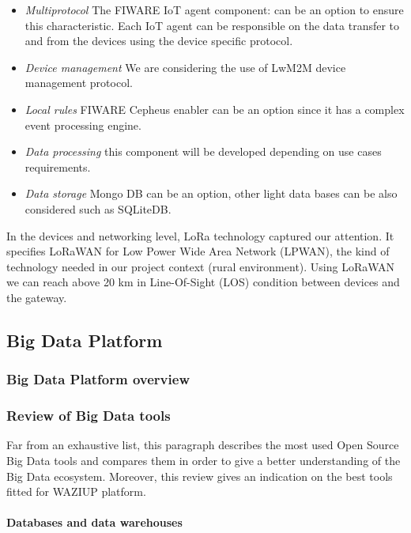 \begin{itemize}
    \item \emph{Multiprotocol}
The FIWARE IoT agent component: can be an option to ensure this characteristic. 
Each IoT agent can be responsible on the data transfer to and from the devices using the device specific protocol. 
    \item \emph{Device management}
We are considering the use of LwM2M device management protocol.
    \item \emph{Local rules}
FIWARE Cepheus enabler can be an option since it has a complex event processing engine. 
    \item \emph{Data processing}
this component will be developed depending on use cases requirements.
    \item \emph{Data storage}
Mongo DB can be an option, other light data bases can be also considered such as SQLiteDB.
\end{itemize}

In the devices and networking level, LoRa technology captured our attention. 
It specifies LoRaWAN for Low Power Wide Area Network (LPWAN), the kind of technology needed in our project context (rural environment). 
Using LoRaWAN we can reach above 20 km in Line-Of-Sight (LOS) condition between devices and the gateway. 


\subsection{Big Data Platform}


\subsubsection{Big Data Platform overview}


\subsubsection{Review of Big Data tools}


Far from an exhaustive list, this paragraph describes the most used Open Source Big Data tools and compares them in order to give a better understanding of the Big Data ecosystem. Moreover, this review gives an indication on the best tools fitted for WAZIUP platform. 


\paragraph{Databases and data warehouses}

